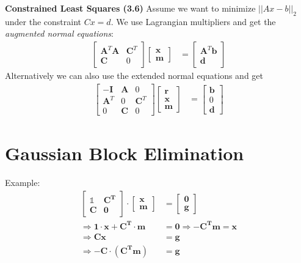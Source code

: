 \documentclass{sciposter}
\renewcommand{\vec}[1]{\mathbf{#1}}
\newcommand{\psection}[1]{\par \textbf{\large#1}}
\begin{document}
\begin{multicols}{2}
\psection{Constrained Least Squares (3.6)}
Assume we want to minimize $|| Ax-b ||_2$ under the constraint $Cx = d$. We use Lagrangian multipliers and get the \textit{augmented normal equations}:
\begin{align*}
	  \begin{bmatrix}
	\vec{A}^T\vec{A} & \vec{C}^T \\ 
\vec{C} & 0 
	\end{bmatrix} \begin{bmatrix}
	\vec{x} \\ \vec{m} 
	\end{bmatrix} &= \begin{bmatrix}
	\vec{A}^T \vec{b}\\ \vec{d}
	\end{bmatrix}
\end{align*}
Alternatively we can also use the extended normal equations and get
\begin{align*}
\begin{bmatrix}
\vec{-I} & \vec{A} & 0\\
\vec{A}^T & 0 & \vec{C}^T\\
0 & \vec{C} & 0 
\end{bmatrix}
\begin{bmatrix}
\vec{r} \\ \vec{x} \\ \vec{m} 
\end{bmatrix} &=
\begin{bmatrix}
\vec{b}\\ 0 \\ \vec{d}
\end{bmatrix}
\end{align*}


\section*{Gaussian Block Elimination}
Example:\begin{align*}
\begin{bmatrix}
\vec{\mathbb{1}} & \vec{C^T} \\
\vec{C} & \vec{0}
\end{bmatrix} \cdot \begin{bmatrix}
\vec{x} \\ \vec{m}
\end{bmatrix} &= \begin{bmatrix}
\vec{0} \\ \vec{g}
\end{bmatrix}\\
\Rightarrow \vec{1\cdot x} + \vec{C^T\cdot m} &= \vec{0} \Rightarrow -\vec{C^T}\vec{m} = \vec{x}\\
\Rightarrow \vec{C x} &= \vec{g} \\
\Rightarrow \vec{-C}\cdot( \vec{C^Tm}) &= \vec{g}
\end{align*}




\end{multicols}
\end{document}

